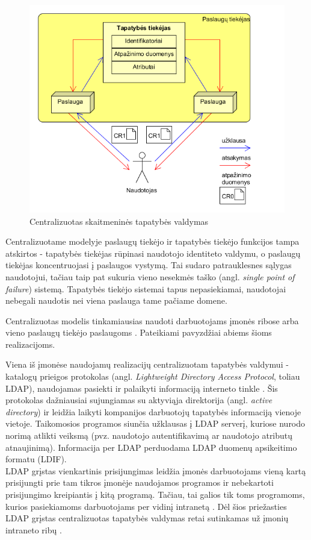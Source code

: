 \begin{figure}[H]
    \centering
    \includegraphics[scale=0.8]{img/centralizedModel}
    \caption{Centralizuotas skaitmeninės tapatybės valdymas \cite{Cao2010}}
    \label{fig:centralisedModel}
\end{figure}

Centralizuotame modelyje paslaugų tiekėjo ir tapatybės tiekėjo funkcijos tampa atskirtos - 
tapatybės tiekėjas rūpinasi naudotojo identiteto valdymu, o paslaugų tiekėjas koncentruojasi į paslaugos vystymą. Tai sudaro patrauklesnes sąlygas
naudotojui, tačiau taip pat sukuria vieno nesekmės taško (angl. \textit{single point of failure}) sistemą. Tapatybės tiekėjo sistemai tapus nepasiekiamai,
naudotojai nebegali naudotis nei viena paslauga tame pačiame domene.


Centralizuotas modelis tinkamiausias naudoti darbuotojams įmonės ribose arba vieno paslaugų tiekėjo paslaugoms \cite{Josang2005}.
Pateikiami pavyzdžiai abiems šioms realizacijoms. 

Viena iš įmonėse naudojamų realizacijų centralizuotam tapatybės valdymui - 
katalogų prieigos protokolas (angl. \textit{Lightweight Directory Access Protocol}, toliau LDAP), naudojamas pasiekti ir palaikyti informaciją interneto tinkle \cite{Strictest2011}.
Šis protokolas dažniausiai sujungiamas su aktyviąja direktorija (angl. \textit{active directory}) ir leidžia laikyti kompanijos darbuotojų
tapatybės informaciją vienoje vietoje. Taikomosios programos siunčia užklausas į LDAP serverį, kuriose nurodo norimą atlikti veiksmą (pvz. naudotojo
autentifikavimą ar naudotojo atributų atnaujinimą). Informacija per LDAP perduodama LDAP duomenų apsikeitimo formatu (LDIF).\\
LDAP grįstas vienkartinis prisijungimas leidžia įmonės darbuotojams vieną kartą prisijungti prie tam tikros įmonėje naudojamos programos ir
nebekartoti prisijungimo kreipiantis į kitą programą. Tačiau, tai galios tik toms programoms, kurios pasiekiamoms darbuotojams per vidinį intranetą
\cite{Strictest2011}. Dėl šios priežasties LDAP grįstas centralizuotas tapatybės valdymas retai sutinkamas už įmonių intraneto ribų \cite{Strictest2011}.

